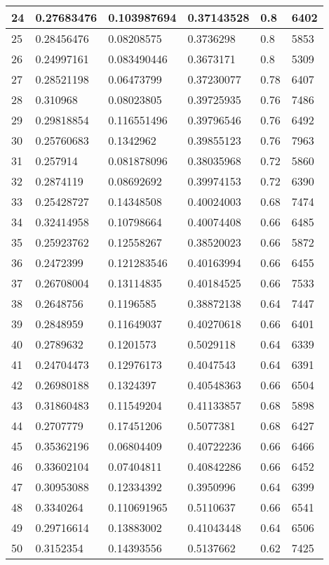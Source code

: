 \begin{longtable}{|l|l|l|l|l|l|}
24 & 0.27683476 & 0.103987694 & 0.37143528 & 0.8 & 6402 \\ \hline 
25 & 0.28456476 & 0.08208575 & 0.3736298 & 0.8 & 5853 \\ \hline 
26 & 0.24997161 & 0.083490446 & 0.3673171 & 0.8 & 5309 \\ \hline 
27 & 0.28521198 & 0.06473799 & 0.37230077 & 0.78 & 6407 \\ \hline 
28 & 0.310968 & 0.08023805 & 0.39725935 & 0.76 & 7486 \\ \hline 
29 & 0.29818854 & 0.116551496 & 0.39796546 & 0.76 & 6492 \\ \hline 
30 & 0.25760683 & 0.1342962 & 0.39855123 & 0.76 & 7963 \\ \hline 
31 & 0.257914 & 0.081878096 & 0.38035968 & 0.72 & 5860 \\ \hline 
32 & 0.2874119 & 0.08692692 & 0.39974153 & 0.72 & 6390 \\ \hline 
33 & 0.25428727 & 0.14348508 & 0.40024003 & 0.68 & 7474 \\ \hline 
34 & 0.32414958 & 0.10798664 & 0.40074408 & 0.66 & 6485 \\ \hline 
35 & 0.25923762 & 0.12558267 & 0.38520023 & 0.66 & 5872 \\ \hline 
36 & 0.2472399 & 0.121283546 & 0.40163994 & 0.66 & 6455 \\ \hline 
37 & 0.26708004 & 0.13114835 & 0.40184525 & 0.66 & 7533 \\ \hline 
38 & 0.2648756 & 0.1196585 & 0.38872138 & 0.64 & 7447 \\ \hline 
39 & 0.2848959 & 0.11649037 & 0.40270618 & 0.66 & 6401 \\ \hline 
40 & 0.2789632 & 0.1201573 & 0.5029118 & 0.64 & 6339 \\ \hline 
41 & 0.24704473 & 0.12976173 & 0.4047543 & 0.64 & 6391 \\ \hline 
42 & 0.26980188 & 0.1324397 & 0.40548363 & 0.66 & 6504 \\ \hline 
43 & 0.31860483 & 0.11549204 & 0.41133857 & 0.68 & 5898 \\ \hline 
44 & 0.2707779 & 0.17451206 & 0.5077381 & 0.68 & 6427 \\ \hline 
45 & 0.35362196 & 0.06804409 & 0.40722236 & 0.66 & 6466 \\ \hline 
46 & 0.33602104 & 0.07404811 & 0.40842286 & 0.66 & 6452 \\ \hline 
47 & 0.30953088 & 0.12334392 & 0.3950996 & 0.64 & 6399 \\ \hline 
48 & 0.3340264 & 0.110691965 & 0.5110637 & 0.66 & 6541 \\ \hline 
49 & 0.29716614 & 0.13883002 & 0.41043448 & 0.64 & 6506 \\ \hline 
50 & 0.3152354 & 0.14393556 & 0.5137662 & 0.62 & 7425 \\ \hline 
\end{longtable}